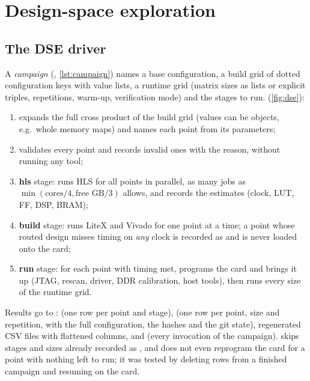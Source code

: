 \section{Design-space exploration}
\label{sec:dse}

\subsection{The DSE driver}
A \emph{campaign} (, \cref{lst:campaign}) names a base configuration, a build grid of
dotted configuration keys with value lists, a runtime grid (matrix sizes as lists or explicit triples, repetitions,
warm-up, verification mode) and the stages to run.  (\cref{fig:dse}):
\begin{enumerate}
  \item expands the full cross product of the build grid (values can be objects, e.g.\ whole memory maps) and names
        each point from its parameters;
  \item validates every point and records invalid ones with the reason, without running any tool;
  \item \textbf{hls} stage: runs HLS for all points in parallel, as many jobs as \(\min(\text{cores}/4,
        \text{free GB}/3)\) allows, and records the estimates (clock, LUT, FF, DSP, BRAM);
  \item \textbf{build} stage: runs LiteX and Vivado for one point at a time; a point whose routed design misses timing
        on \emph{any} clock is recorded as  and is never loaded onto the card;
  \item \textbf{run} stage: for each point with timing met, programs the card and brings it up (JTAG, rescan,
        driver, DDR calibration, host tools), then runs every size of the runtime grid.
\end{enumerate}
Results go to :  (one row per point and stage),  (one row
per point, size and repetition, with the full configuration, the hashes and the git state), regenerated CSV files with
flattened columns, and  (every invocation of the campaign).  skips stages and
sizes already recorded as , and does not even reprogram the card for a point with nothing left to run; it was
tested by deleting rows from a finished campaign and resuming on the card.



